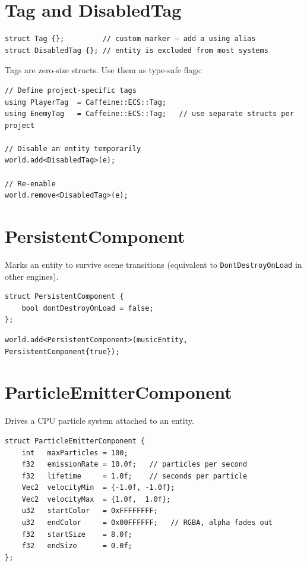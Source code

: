 \section{Tag and DisabledTag}

\begin{lstlisting}
struct Tag {};         // custom marker — add a using alias
struct DisabledTag {}; // entity is excluded from most systems
\end{lstlisting}

Tags are zero-size structs. Use them as type-safe flags:

\begin{lstlisting}
// Define project-specific tags
using PlayerTag  = Caffeine::ECS::Tag;
using EnemyTag   = Caffeine::ECS::Tag;   // use separate structs per project

// Disable an entity temporarily
world.add<DisabledTag>(e);

// Re-enable
world.remove<DisabledTag>(e);
\end{lstlisting}

\section{PersistentComponent}

Marks an entity to survive scene transitions (equivalent to
\texttt{DontDestroyOnLoad} in other engines).

\begin{lstlisting}
struct PersistentComponent {
    bool dontDestroyOnLoad = false;
};
\end{lstlisting}

\begin{lstlisting}
world.add<PersistentComponent>(musicEntity, PersistentComponent{true});
\end{lstlisting}

\section{ParticleEmitterComponent}

Drives a CPU particle system attached to an entity.

\begin{lstlisting}
struct ParticleEmitterComponent {
    int   maxParticles = 100;
    f32   emissionRate = 10.0f;   // particles per second
    f32   lifetime     = 1.0f;    // seconds per particle
    Vec2  velocityMin  = {-1.0f, -1.0f};
    Vec2  velocityMax  = {1.0f,  1.0f};
    u32   startColor   = 0xFFFFFFFF;
    u32   endColor     = 0x00FFFFFF;   // RGBA, alpha fades out
    f32   startSize    = 8.0f;
    f32   endSize      = 0.0f;
};
\end{lstlisting}

